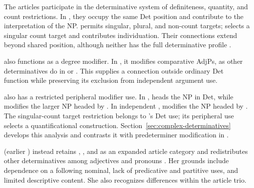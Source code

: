 \documentclass[12pt]{article}
\begin{document}
The articles participate in the determinative system of definiteness, quantity, and count restrictions. In , they occupy the same Det position and contribute to the interpretation of the NP.  permits singular, plural, and non-count targets;  selects a singular count target and contributes individuation. Their connections extend beyond shared position, although neither has the full determinative profile \citep[368--373]{huddleston2002}.

 also functions as a degree modifier. In , it modifies comparative AdjPs, as other determinatives do in  or  \citep[1131--1132, 1135--1136]{huddleston2002}. This supplies a connection outside ordinary Det function while preserving its exclusion from independent argument use.

 also has a restricted peripheral modifier use. In ,  heads the NP in Det, while  modifies the larger NP headed by . In independent ,  modifies the NP headed by . The singular-count target restriction belongs to 's Det use; its peripheral use selects a quantificational construction. Section~\ref{sec:complex-determinatives} develops this analysis and contrasts it with predeterminer modification in .

\textcite[153--158]{spinillo2004reconceptualising} (earlier \citealp{spinillo2000determiners}) instead retains , , and  as an expanded article category and redistributes other determinatives among adjectives and pronouns \citep[194--195]{spinillo2004reconceptualising}. Her grounds include dependence on a following nominal, lack of predicative and partitive uses, and limited descriptive content. She also recognizes differences within the article trio.
\end{document}
